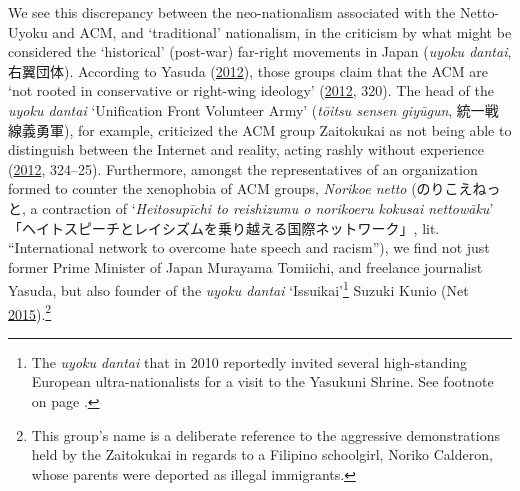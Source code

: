 \documentclass[10pt,british,A4paper,twoside]{memoir}
\makeatletter
\newcommand\footnoteref[1]{\protected@xdef\@thefnmark{\ref{#1}}\@footnotemark}
\makeatother
\begin{document}
We see this discrepancy between the neo-nationalism associated with the
Netto-Uyoku and ACM, and `traditional' nationalism, in the criticism by
what might be considered the `historical' (post-war) far-right movements
in Japan (\emph{uyoku dantai}, 右翼団体). According to Yasuda
(\protect\hyperlink{ref-yasuda_eng:_2012}{2012}), those groups claim
that the ACM are `not rooted in conservative or right-wing ideology'
(\protect\hyperlink{ref-yasuda_eng:_2012}{2012}, 320). The head of the
\emph{uyoku dantai} `Unification Front Volunteer Army' (\emph{tōitsu
sensen giyūgun}, 統一戦線義勇軍), for example, criticized the ACM group
Zaitokukai as not being able to distinguish between the Internet and
reality, acting rashly without experience
(\protect\hyperlink{ref-yasuda_eng:_2012}{2012}, 324--25). Furthermore,
amongst the representatives of an organization formed to counter the
xenophobia of ACM groups, \emph{Norikoe netto} (のりこえねっと, a
contraction of `\emph{Heitosupīchi to reishizumu o norikoeru kokusai
nettowāku}' 「ヘイトスピーチとレイシズムを乗り越える国際ネットワーク」,
lit. ``International network to overcome hate speech and racism''), we
find not just former Prime Minister of Japan Murayama Tomiichi, and
freelance journalist Yasuda, but also founder of the \emph{uyoku dantai}
`Issuikai'\footnote{The \emph{uyoku dantai} that in 2010 reportedly
  invited several high-standing European ultra-nationalists for a visit
  to the Yasukuni Shrine. See footnote \footnoteref{issuikai} on page
  \pageref{issuikai}.} Suzuki Kunio (Net
\protect\hyperlink{ref-net_norikoe_2015}{2015}).\footnote{This group's
  name is a deliberate reference to the aggressive demonstrations held
  by the Zaitokukai in regards to a Filipino schoolgirl, Noriko
  Calderon, whose parents were deported as illegal immigrants.}
\end{document}
